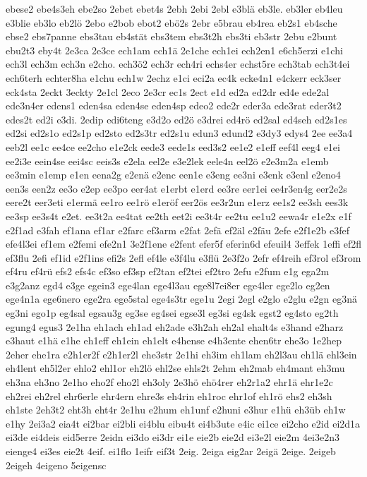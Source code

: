 {ebese2
ebe4s3eh
ebe2so
2ebet
ebet4s
2ebh
2ebi
2ebl
e3blä
eb3le.
eb3ler
eb4leu
e3blie
eb3lo
eb2lö
2ebo
e2bob
ebot2
ebö2s
2ebr
e5brau
eb4rea
eb2s1
eb4sche
ebse2
ebs7panne
ebs3tau
eb4stät
ebs3tem
ebs3t2h
ebs3ti
eb3str
2ebu
e2bunt
ebu2t3
eby4t
2e3ca
2e3ce
ech1am
ech1ä
2e1che
ech1ei
ech2en1
e6ch5erzi
e1chi
ech3l
ech3m
ech3n
e2cho.
ech3ö2
ech3r
ech4ri
echs4er
echst5re
ech3tab
ech3t4ei
ech6terh
echter8ha
e1chu
ech1w
2echz
e1ci
eci2a
ec4k
ecke4n1
e4ckerr
eck3ser
eck4sta
2eckt
3eckty
2e1cl
2eco
2e3cr
ec1s
2ect
e1d
ed2a
ed2dr
ed4e
ede2al
ede3n4er
edens1
eden4sa
eden4se
eden4sp
edeo2
ede2r
eder3a
ede3rat
eder3t2
edes2t
ed2i
e3di.
2edip
edi6teng
e3d2o
ed2ö
e3drei
ed4rö
ed2sal
ed4seh
ed2s1es
ed2si
ed2s1o
ed2s1p
ed2sto
ed2s3tr
ed2s1u
edun3
edund2
e3dy3
edys4
2ee
ee3a4
eeb2l
ee1c
ee4ce
ee2cho
e1e2ck
eede3
eede1s
eed3s2
ee1e2
e1eff
eef4l
eeg4
e1ei
ee2i3e
eein4se
eei4sc
eeis3s
e2ela
eel2e
e3e2lek
eele4n
eel2ö
e2e3m2a
e1emb
ee3min
e1emp
e1en
eena2g
e2enä
e2enc
een1e
e3eng
ee3ni
e3enk
e3enl
e2eno4
een3s
een2z
ee3o
e2ep
ee3po
eer4at
e1erbt
e1erd
ee3re
eer1ei
ee4r3en4g
eer2e2s
eere2t
eer3eti
e1ermä
ee1ro
ee1rö
e1eröf
eer2ös
ee3r2un
e1erz
ee1s2
ee3sh
ees3k
ee3sp
ee3s4t
e2et.
ee3t2a
ee4tat
ee2th
eet2i
ee3t4r
ee2tu
ee1u2
eewa4r
e1e2x
e1f
e2f1ad
e3fah
ef1ana
ef1ar
e2farc
ef3arm
e2fat
2efä
ef2äl
e2fäu
2efe
e2f1e2b
e3fef
efe4l3ei
ef1em
e2femi
efe2n1
3e2f1ene
e2fent
efer5f
eferin6d
efeuil4
3effek
1effi
ef2fl
ef3flu
2efi
ef1id
e2f1ins
efi2s
2efl
ef4le
e3f4lu
e3flü
2e3f2o
2efr
ef4reih
ef3rol
ef3rom
ef4ru
ef4rü
efs2
efs4c
ef3so
ef3sp
ef2tan
ef2tei
ef2tro
2efu
e2fum
e1g
ega2m
e3g2anz
egd4
e3ge
egein3
ege4lan
ege4l3au
ege8l7ei8er
ege4ler
ege2lo
eg2en
ege4n1a
ege6nero
ege2ra
ege5stal
ege4s3tr
ege1u
2egi
2egl
e2glo
e2glu
e2gn
eg3nä
eg3ni
ego1p
eg4sal
egsau3g
eg3se
eg4sei
egse3l
eg3si
eg4sk
egst2
eg4sto
eg2th
egung4
egus3
2e1ha
eh1ach
eh1ad
eh2ade
e3h2ah
eh2al
ehalt4s
e3hand
e2harz
e3haut
e1hä
e1he
eh1eff
eh1ein
eh1elt
e4hense
e4h3ente
ehen6tr
ehe3o
1e2hep
2eher
ehe1ra
e2h1er2f
e2h1er2l
ehe3str
2e1hi
eh3im
eh1lam
eh2l3au
eh1lä
ehl3ein
eh4lent
eh5l2er
ehlo2
ehl1or
eh2lö
ehl2se
ehls2t
2ehm
eh2mab
eh4mant
eh3mu
eh3na
eh3no
2e1ho
eho2f
eho2l
eh3oly
2e3hö
ehö4rer
eh2r1a2
ehr1ä
ehr1e2c
eh2rei
eh2rel
ehr6erle
ehr4ern
ehre3s
eh4rin
eh1roc
ehr1of
eh1rö
ehs2
eh3sh
eh1ste
2eh3t2
eht3h
eht4r
2e1hu
e2hum
eh1unf
e2huni
e3hur
e1hü
eh3üb
eh1w
e1hy
2ei3a2
eia4t
ei2bar
ei2bli
ei4blu
eibu4t
ei4b3ute
e4ic
ei1ce
ei2cho
e2id
ei2d1a
ei3de
ei4deis
eid5erre
2eidn
ei3do
ei3dr
ei1e
eie2b
eie2d
ei3e2l
eie2m
4ei3e2n3
eienge4
ei3es
eie2t
4eif.
ei1flo
1eifr
eif3t
2eig.
2eiga
eig2ar
2eigä
2eige.
2eigeb
2eigeh
4eigeno
5eigensc
}
